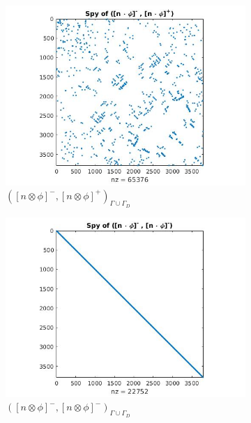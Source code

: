\documentclass[a4paper,12pt]{book}
\begin{document}
\begin{figure}[H]
\begin{subfigure}{.5\textwidth}
  \includegraphics[width=\linewidth]{figure23.jpg}
  \caption{$([n \otimes \phi]^-,[n \otimes \phi]^+)_{\Gamma \cup \Gamma_D}$}
  \label{fig:figure23}
\end{subfigure}
\begin{subfigure}{.5\textwidth}	
\centering
  \includegraphics[width=\linewidth]{figure24.jpg}
  \caption{$([n \otimes \phi]^-,[n \otimes \phi]^-)_{\Gamma \cup \Gamma_D}$}
  \label{fig:figure24}
\end{subfigure}
\begin{subfigure}{\textwidth}	
\centering

\end{subfigure}
\end{figure}
\end{document}

